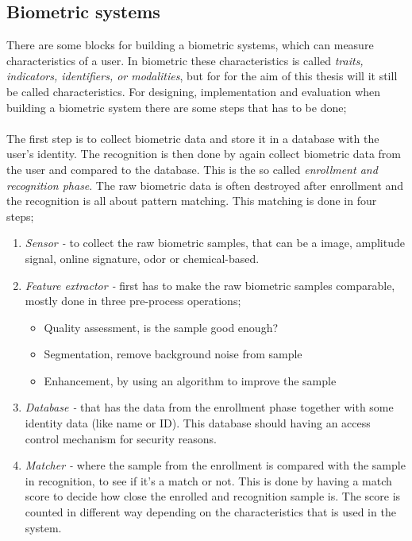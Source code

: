 \subsection{Biometric systems}\label{sec:bioSys}
There are some blocks for building a biometric systems, which can measure characteristics of a user. In biometric these characteristics is called \textit{traits, indicators, identifiers, or modalities}, but for for the aim of this thesis will it still be called characteristics. For designing, implementation and evaluation when building a biometric system there are some steps that has to be done;\\
\\
The first step is to collect biometric data and store it in a database with the user’s identity. The recognition is then done by again collect biometric data from the user and compared to the database. This is the so called \textit{enrollment and recognition phase}. The raw biometric data is often destroyed after enrollment and the recognition is all about pattern matching. This matching is done in four steps;
\begin{enumerate}
	\item \textit{Sensor -} to collect the raw biometric samples, that can be a image, amplitude signal, online signature, odor or chemical-based.
	\item \textit{Feature extractor -} first has to make the raw biometric samples comparable, mostly done in three pre-process operations; 
	\begin{itemize}
    	\item Quality assessment, is the sample good enough?
		\item Segmentation, remove background noise from sample
		\item Enhancement, by using an algorithm to improve the sample 
    \end{itemize}
	\item \textit{Database -} that has the data from the enrollment phase together with some identity data (like name or ID). This database should having an access control mechanism for security reasons.
	\item \textit{Matcher -} where the sample from the enrollment is compared with the sample in recognition, to see if it's a match or not. This is done by having a match score to decide how close the enrolled and recognition sample is. The score is counted in different way depending on the characteristics that is used in the system. 
\end{enumerate}
\cite[ch.~1]{introbio}

